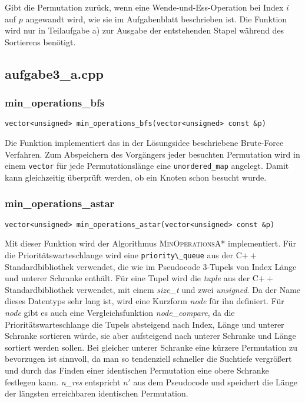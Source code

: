 \documentclass[a4paper, 10pt, ngerman]{article}
\begin{document}
\noindent Gibt die Permutation zurück, wenn eine Wende-und-Ess-Operation bei Index $i$ auf $p$ angewandt wird, wie sie im Aufgabenblatt beschrieben ist. Die Funktion wird nur in Teilaufgabe a) zur Ausgabe der entstehenden Stapel während des Sortierens benötigt.

\subsection{aufgabe3\_a.cpp}

\subsubsection{min\_operations\_bfs}
\verb|vector<unsigned> min_operations_bfs(vector<unsigned> const &p)|
\medskip

\noindent Die Funktion implementiert das in der Lösungsidee beschriebene Brute-Force Verfahren. Zum Abspeichern des Vorgängers jeder besuchten Permutation wird in einem \verb|vector| für jede Permutationslänge eine \verb|unordered_map| angelegt. Damit kann gleichzeitig überprüft werden, ob ein Knoten schon besucht wurde.

\subsubsection{min\_operations\_astar}
\verb|vector<unsigned> min_operations_astar(vector<unsigned> const &p)|
\medskip

\noindent Mit dieser Funktion wird der Algorithmus \textsc{MinOperationsA*} implementiert. Für die Prioritätswarteschlange wird eine \verb|priority\_queue| aus der C$++$ Standardbibliothek verwendet, die wie im Pseudocode 3-Tupels von Index Länge und unterer Schranke enthält. Für eine Tupel wird die \emph{tuple} aus der C$++$ Standardbibliothek verwendet, mit einem \emph{size\_t} und zwei \emph{unsigned}. Da der Name dieses Datentyps sehr lang ist, wird eine Kurzform \emph{node} für ihn definiert. Für \emph{node} gibt es auch eine Vergleichsfunktion \emph{node\_compare}, da die Prioritätswarteschlange die Tupels absteigend nach Index, Länge und unterer Schranke sortieren würde, sie aber aufsteigend nach unterer Schranke und Länge sortiert werden sollen. Bei gleicher unterer Schranke eine kürzere Permutation zu bevorzugen ist sinnvoll, da man so tendenziell schneller die Suchtiefe vergrößert und durch das Finden einer identischen Permutation eine obere Schranke festlegen kann. \emph{n\_res} entspricht $n'$ aus dem Pseudocode und speichert die Länge der längsten erreichbaren identischen Permutation.
\end{document}
